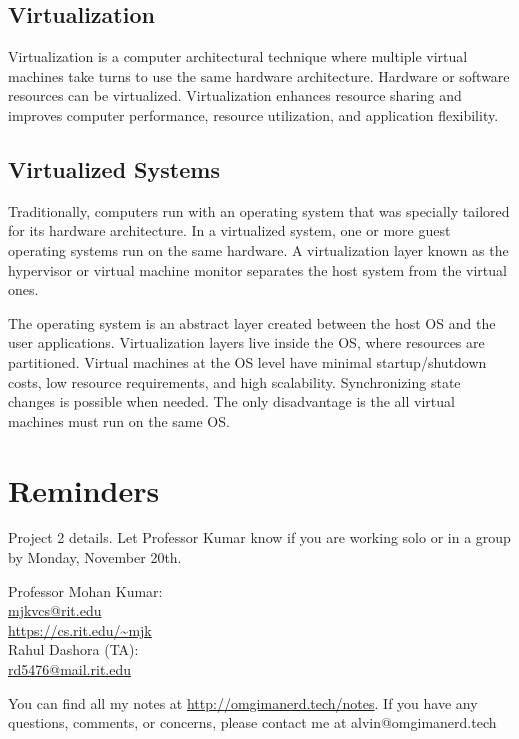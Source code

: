 \documentclass{math}
\begin{document}
\subsection*{Virtualization}
Virtualization is a computer architectural technique where multiple virtual
machines take turns to use the same hardware architecture. Hardware or software
resources can be virtualized. Virtualization enhances resource sharing and
improves computer performance, resource utilization, and application
flexibility.

\subsection*{Virtualized Systems}
Traditionally, computers run with an operating system that was specially
tailored for its hardware architecture. In a virtualized system, one or more
guest operating systems run on the same hardware. A virtualization layer
known as the hypervisor or virtual machine monitor separates the host system
from the virtual ones. \par
The operating system is an abstract layer created between the host OS and the
user applications. Virtualization layers live inside the OS, where resources
are partitioned. Virtual machines at the OS level have minimal startup/shutdown
costs, low resource requirements, and high scalability. Synchronizing state
changes is possible when needed. The only disadvantage is the all virtual
machines must run on the same OS.

\section*{Reminders}
Project 2 details. Let Professor Kumar know if you are working solo or in a
group by Monday, November 20th.

\noindent Professor Mohan Kumar: \\
\url{mjkvcs@rit.edu} \\
\url{https://cs.rit.edu/~mjk} \\

\noindent Rahul Dashora (TA): \\
\url{rd5476@mail.rit.edu} \\

\begin{center}
  You can find all my notes at \url{http://omgimanerd.tech/notes}. If you have
  any questions, comments, or concerns, please contact me at
  alvin@omgimanerd.tech
\end{center}
\end{document}
